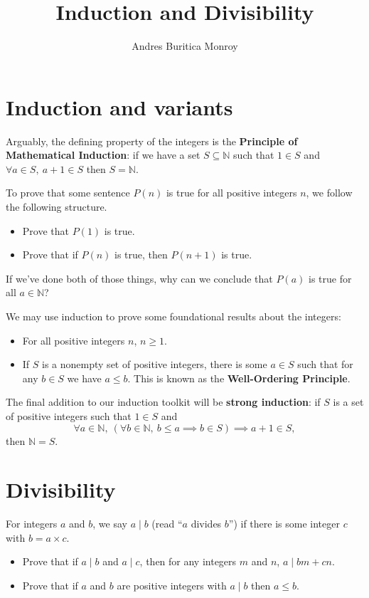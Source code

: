 \documentclass{article}
\title{Induction and Divisibility}
\author{Andres Buritica Monroy}
\date{}
\begin{document}
\maketitle
\section{Induction and variants}
  Arguably, the defining property of the integers is the \textbf{Principle of
    Mathematical Induction}: if we have a set $S\subseteq\mathbb N$ such that
    $1\in S$ and $\forall a\in S,\ a+1\in S$ then $S=\mathbb N$.
  
  To prove that some sentence $P(n)$ is true for all positive integers $n$, we
  follow the following structure.
  \begin{itemize}
    \item Prove that $P(1)$ is true.
    \item Prove that if $P(n)$ is true, then $P(n+1)$ is true.
  \end{itemize}
  If we've done both of those things, why can we conclude that $P(a)$ is true
  for all $a\in\mathbb N$?

  We may use induction to prove some foundational results about the integers:
  \begin{itemize}
    \item For all positive integers $n$, $n\ge 1$.
    \item If $S$ is a nonempty set of positive integers, there is some $a\in
      S$ such that for any $b\in S$ we have $a\le b$.
      This is known as the \textbf{Well-Ordering Principle}.
  \end{itemize}

  The final addition to our induction toolkit will be \textbf{strong induction}:
  if $S$ is a set of positive integers such that $1\in S$ and
      \[\forall a\in \mathbb N,\ (\forall b\in\mathbb N,\ b\le a\implies b\in
        S)\implies a+1\in S,\]
        then $\mathbb N=S$.
\section{Divisibility}
  For integers $a$ and $b$, we say $a\mid b$ (read ``$a$ divides
  $b$'') if there is some integer $c$ with $b=a\times c$.
  \begin{itemize}
    \item Prove that if $a\mid b$ and $a\mid c$, then for any integers $m$ and
      $n$, $a\mid bm+cn$.
    \item Prove that if $a$ and $b$ are positive integers with $a\mid b$ then
      $a\le b$.
  \end{itemize}
\end{document}
